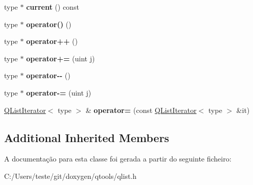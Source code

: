 \begin{DoxyCompactItemize}
\item 
\hypertarget{class_q_list_iterator_ac22b90cda8a81fe45ae121578fcf9726}{type $\ast$ {\bfseries current} () const }\label{class_q_list_iterator_ac22b90cda8a81fe45ae121578fcf9726}

\item 
\hypertarget{class_q_list_iterator_a53bb20f7dd4f90cc047f999b7dec5fe0}{type $\ast$ {\bfseries operator()} ()}\label{class_q_list_iterator_a53bb20f7dd4f90cc047f999b7dec5fe0}

\item 
\hypertarget{class_q_list_iterator_a60e0a5b2a616525ebaec6c235b066c3e}{type $\ast$ {\bfseries operator++} ()}\label{class_q_list_iterator_a60e0a5b2a616525ebaec6c235b066c3e}

\item 
\hypertarget{class_q_list_iterator_a689beef631dff5b294c16f1246e6c230}{type $\ast$ {\bfseries operator+=} (uint j)}\label{class_q_list_iterator_a689beef631dff5b294c16f1246e6c230}

\item 
\hypertarget{class_q_list_iterator_a27b7f0088525ef58cf50fd09f9fdda1e}{type $\ast$ {\bfseries operator-\/-\/} ()}\label{class_q_list_iterator_a27b7f0088525ef58cf50fd09f9fdda1e}

\item 
\hypertarget{class_q_list_iterator_a2b73339c97d5e4813c6919bfb3b1f8d1}{type $\ast$ {\bfseries operator-\/=} (uint j)}\label{class_q_list_iterator_a2b73339c97d5e4813c6919bfb3b1f8d1}

\item 
\hypertarget{class_q_list_iterator_ad0bc570d795d2b17df8487994c8ac3eb}{\hyperlink{class_q_list_iterator}{Q\-List\-Iterator}$<$ type $>$ \& {\bfseries operator=} (const \hyperlink{class_q_list_iterator}{Q\-List\-Iterator}$<$ type $>$ \&it)}\label{class_q_list_iterator_ad0bc570d795d2b17df8487994c8ac3eb}

\end{DoxyCompactItemize}
\subsection*{Additional Inherited Members}


A documentação para esta classe foi gerada a partir do seguinte ficheiro\-:\begin{DoxyCompactItemize}
\item 
C\-:/\-Users/teste/git/doxygen/qtools/qlist.\-h\end{DoxyCompactItemize}

